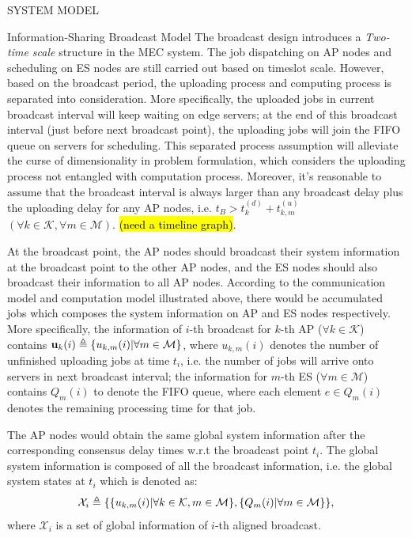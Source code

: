 \documentclass[10pt, conference, letterpaper]{IEEEtran}
\newcommand{\define}{\triangleq}
\renewcommand{\vec}{\mathbf}
\DeclarePairedDelimiter{\set}{\{}{\}}
\newcommand{\apSet}{\mathcal{K}}
\newcommand{\esSet}{\mathcal{M}}
\newcommand{\Obsv}{\mathcal{X}}
\begin{document}
\begin{section}{SYSTEM MODEL}
\begin{subsection}{Information-Sharing Broadcast Model}
            The broadcast design introduces a \emph{Two-time scale} structure in the MEC system. The job dispatching on AP nodes and scheduling on ES nodes are still carried out based on timeslot scale. However, based on the broadcast period, the uploading process and computing process is separated into consideration.
            More specifically, the uploaded jobs in current broadcast interval will keep waiting on edge servers; at the end of this broadcast interval (just before next broadcast point), the uploading jobs will join the FIFO queue on servers for scheduling. This separated process assumption will alleviate the curse of dimensionality in problem formulation, which considers the uploading process not entangled with computation process.
            Moreover, it's reasonable to assume that the broadcast interval is always larger than any broadcast delay plus the uploading delay for any AP nodes, i.e. $t_B > t^{(d)}_{k} + t^{(u)}_{k,m}$ $(\forall k\in\apSet, \forall m\in\esSet)$. \hl{(need a timeline graph)}.
            
            At the broadcast point, the AP nodes should broadcast their system information at the broadcast point to the other AP nodes, and the ES nodes should also broadcast their information to all AP nodes. According to the communication model and computation model illustrated above, there would be accumulated jobs which composes the system information on AP and ES nodes respectively.
            More specifically, the information of $i$-th broadcast for $k$-th AP ($\forall k\in\apSet$) contains $\vec{u}_k(i) \define \set{u_{k,m}(i)|\forall m\in\esSet}$, where $u_{k,m}(i)$ denotes the number of unfinished uploading jobs at time $t_i$, i.e. the number of jobs will arrive onto servers in next broadcast interval; the information for $m$-th ES ($\forall m\in\esSet$) contains $Q_m(i)$ to denote the FIFO queue, where each element $e \in Q_m(i)$ denotes the remaining processing time for that job.
            
            The AP nodes would obtain the same global system information after the corresponding consensus delay times w.r.t the broadcast point $t_i$. The global system information is composed of all the broadcast information, i.e. the global system states at $t_i$ which is denoted as:
            \begin{align}
                \Obsv_i \define \{ \set{u_{k,m}(i)|\forall k\in\apSet,m\in\esSet}, \set{Q_m(i)|\forall m\in\esSet} \},
            \end{align}
            where $\Obsv_i$ is a set of global information of $i$-th aligned broadcast.
        \end{subsection}
    \end{section}
\end{document}
